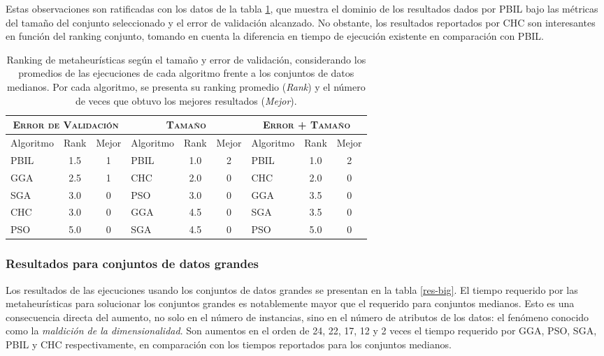 Estas observaciones son ratificadas con los datos de la tabla \ref{res-med-rank}, que muestra el dominio de los resultados dados por PBIL bajo las métricas del tamaño del conjunto seleccionado y el error de validación alcanzado. No obstante, los resultados reportados por CHC son interesantes en función del ranking conjunto, tomando en cuenta la diferencia en tiempo de ejecución existente en comparación con PBIL.

\begin{table}[h!]
\centering
\begin{tabular}{l c c|l c c|l c c}
\hline
\multicolumn{3}{c|}{\textsc{Error de Validación}}
	& \multicolumn{3}{c|}{\textsc{Tamaño}}
	& \multicolumn{3}{c}{\textsc{Error + Tamaño}} \\
\hline
Algoritmo & Rank & Mejor & Algoritmo & Rank & Mejor & Algoritmo & Rank & Mejor \\
\hline
\hline
PBIL & 1.5 & 1 & PBIL & 1.0 & 2 & PBIL & 1.0 & 2 \\
GGA  & 2.5 & 1 & CHC  & 2.0 & 0 & CHC  & 2.0 & 0 \\
SGA  & 3.0 & 0 & PSO  & 3.0 & 0 & GGA  & 3.5 & 0 \\
CHC  & 3.0 & 0 & GGA  & 4.5 & 0 & SGA  & 3.5 & 0 \\
PSO  & 5.0 & 0 & SGA  & 4.5 & 0 & PSO  & 5.0 & 0 \\
\hline
\end{tabular}
\caption[Ranking de metaheurísticas según el tamaño y error de validación en conjuntos de datos medianos]{Ranking de metaheurísticas según el tamaño y error de validación, considerando los promedios de las ejecuciones de cada algoritmo frente a los conjuntos de datos medianos. Por cada algoritmo, se presenta su ranking promedio (\emph{Rank}) y el número de veces que obtuvo los mejores resultados (\emph{Mejor}).}
\label{res-med-rank}
\end{table}

\subsubsection{Resultados para conjuntos de datos grandes}

Los resultados de las ejecuciones usando los conjuntos de datos grandes se presentan en la tabla \ref{res-big}. El tiempo requerido por las metaheurísticas para solucionar los conjuntos grandes es notablemente mayor que el requerido para conjuntos medianos. Esto es una consecuencia directa del aumento, no solo en el número de instancias, sino en el número de atributos de los datos: el fenómeno conocido como la \guillemotleft\emph{maldición de la dimensionalidad}\guillemotright. Son aumentos en el orden de 24, 22, 17, 12 y 2 veces el tiempo requerido por GGA, PSO, SGA, PBIL y CHC respectivamente, en comparación con los tiempos reportados para los conjuntos medianos.

